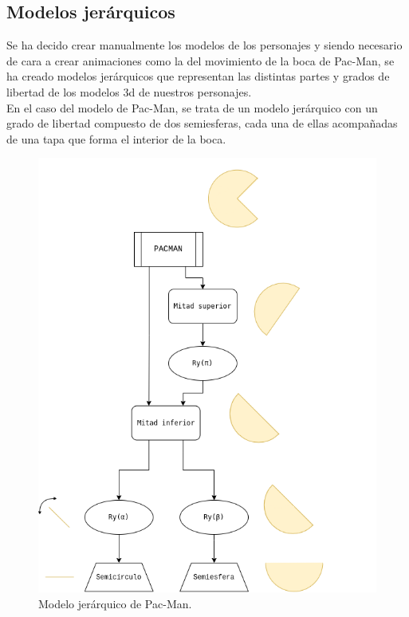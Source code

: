 \subsection{Modelos jerárquicos}

Se ha decido crear manualmente los modelos de los personajes y siendo necesario de cara a crear animaciones como la del movimiento de la boca de Pac-Man, se ha creado modelos jerárquicos que representan las distintas partes y grados de libertad de los modelos \acrshort{3d} de nuestros personajes.\\

En el caso del modelo de Pac-Man, se trata de un modelo jerárquico con un grado de libertad compuesto de dos semiesferas, cada una de ellas acompañadas de una tapa que forma el interior de la boca.

\begin{figure}[H]
    \begin{center}
        \includegraphics[scale=0.45]{img/pacman_jerarquico.png}
        \caption{Modelo jerárquico de Pac-Man.}
    \end{center}
\end{figure}

